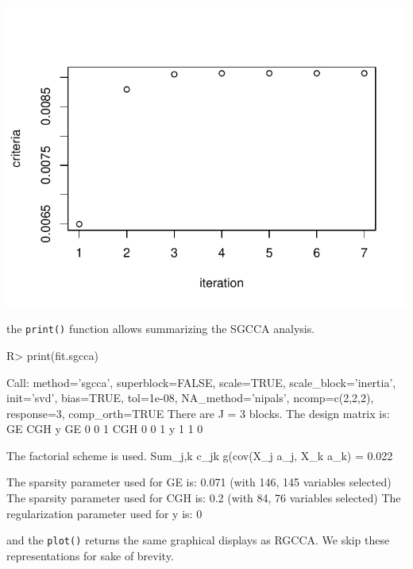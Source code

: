 \documentclass[
]{jss}
\begin{document}
\begin{CodeChunk}
\begin{center}\includegraphics{RGCCA_21022023_files/figure-latex/unnamed-chunk-38-2} \end{center}

\end{CodeChunk}

\normalsize

the \texttt{print()} function allows summarizing the SGCCA analysis.

\footnotesize

\begin{CodeChunk}
\begin{CodeInput}
R> print(fit.sgcca)
\end{CodeInput}
\begin{CodeOutput}
Call: method='sgcca', superblock=FALSE, scale=TRUE, scale_block='inertia',
init='svd', bias=TRUE, tol=1e-08, NA_method='nipals', ncomp=c(2,2,2),
response=3, comp_orth=TRUE 
There are J = 3 blocks.
The design matrix is:
    GE CGH y
GE   0   0 1
CGH  0   0 1
y    1   1 0

The factorial scheme is used.
Sum_{j,k} c_jk g(cov(X_j a_j, X_k a_k) = 0.022 

The sparsity parameter used for GE is: 0.071 (with 146, 145 variables selected)
The sparsity parameter used for CGH is: 0.2 (with 84, 76 variables selected)
The regularization parameter used for y is: 0
\end{CodeOutput}
\end{CodeChunk}

\normalsize

and the \texttt{plot()} returns the same graphical displays as RGCCA. We
skip these representations for sake of brevity.
\end{document}
